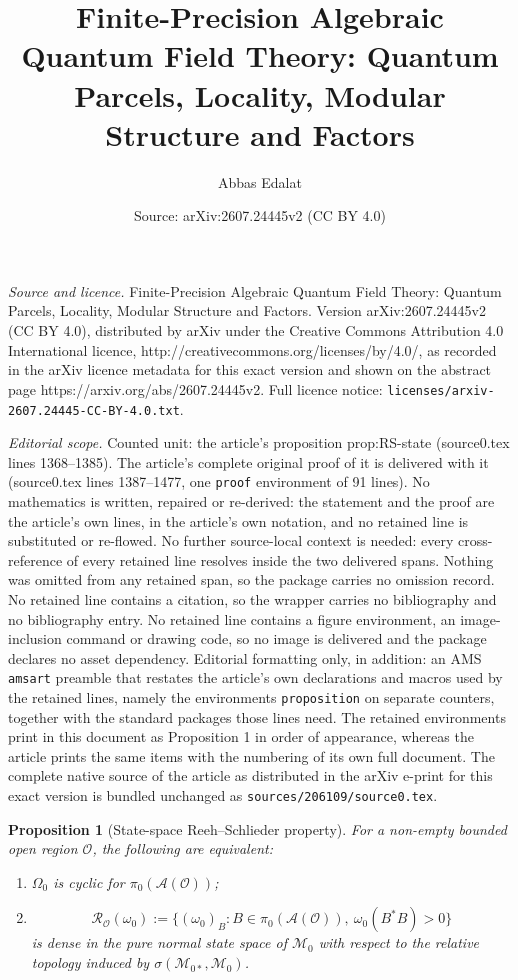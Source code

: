 \documentclass[10pt,a4paper]{amsart}
\title{Finite-Precision Algebraic Quantum Field Theory: Quantum Parcels, Locality, Modular Structure and Factors}
\author{Abbas Edalat}
\date{Source: arXiv:2607.24445v2 (CC BY 4.0)}
\newtheorem{proposition}{Proposition}
\newcommand{\A}{\mathcal{A}}
\begin{document}
\maketitle

\noindent\emph{Source and licence.} Finite-Precision Algebraic Quantum Field Theory: Quantum Parcels, Locality, Modular Structure and Factors. Version arXiv:2607.24445v2 (CC BY 4.0), distributed by arXiv under the Creative Commons Attribution 4.0 International licence, http://creativecommons.org/licenses/by/4.0/, as recorded in the arXiv licence metadata for this exact version and shown on the abstract page https://arxiv.org/abs/2607.24445v2. Full licence notice: \texttt{licenses/arxiv-2607.24445-CC-BY-4.0.txt}.\par\smallskip

\noindent\textit{Editorial scope.} Counted unit: the article's proposition prop:RS-state (source0.tex lines 1368--1385). The article's complete original proof of it is delivered with it (source0.tex lines 1387--1477, one \texttt{proof} environment of 91 lines). No mathematics is written, repaired or re-derived: the statement and the proof are the article's own lines, in the article's own notation, and no retained line is substituted or re-flowed.  No further source-local context is needed: every cross-reference of every retained line resolves inside the two delivered spans.  Nothing was omitted from any retained span, so the package carries no omission record.  No retained line contains a citation, so the wrapper carries no bibliography and no bibliography entry.  No retained line contains a figure environment, an image-inclusion command or drawing code, so no image is delivered and the package declares no asset dependency.  Editorial formatting only, in addition: an AMS \texttt{amsart} preamble that restates the article's own declarations and macros used by the retained lines, namely the environments \texttt{proposition} on separate counters, together with the standard packages those lines need.  The retained environments print in this document as Proposition 1 in order of appearance, whereas the article prints the same items with the numbering of its own full document.  The complete native source of the article as distributed in the arXiv e-print for this exact version is bundled unchanged as \texttt{sources/206109/source0.tex}.
\begin{proposition}[State-space Reeh--Schlieder property]
\label{prop:RS-state}
For a non-empty bounded open region $\mathcal O$, the following are
equivalent:
\begin{enumerate}
\item $\Omega_0$ is cyclic for $\pi_0(\A(\mathcal O))$;
\item
\[
\mathcal R_{\mathcal O}(\omega_0)
:=
\{(\omega_0)_B:
B\in\pi_0(\A(\mathcal O)),\ \omega_0(B^*B)>0\}
\]
is dense in the pure normal state space of $\mathcal M_0$ with respect
to the relative topology induced by
$\sigma(\mathcal M_{0*},\mathcal M_0)$.
\end{enumerate}
\end{proposition}
\end{document}

